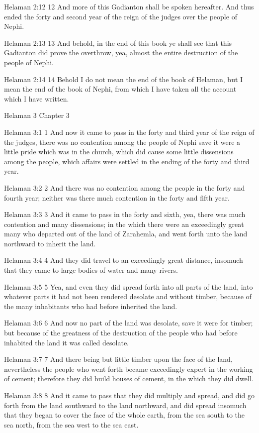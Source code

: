 Helaman 2:12
 12 And more of this Gadianton shall be spoken hereafter. And
thus ended the forty and second year of the reign of the judges
over the people of Nephi.

Helaman 2:13
 13 And behold, in the end of this book ye shall see that this
Gadianton did prove the overthrow, yea, almost the entire
destruction of the people of Nephi.

Helaman 2:14
 14 Behold I do not mean the end of the book of Helaman, but I
mean the end of the book of Nephi, from which I have taken all
the account which I have written.

Helaman 3
Chapter 3

Helaman 3:1
 1 And now it came to pass in the forty and third year of the
reign of the judges, there was no contention among the people of
Nephi save it were a little pride which was in the church, which
did cause some little dissensions among the people, which affairs
were settled in the ending of the forty and third year.

Helaman 3:2
 2 And there was no contention among the people in the forty and
fourth year; neither was there much contention in the forty and
fifth year.

Helaman 3:3
 3 And it came to pass in the forty and sixth, yea, there was
much contention and many dissensions; in the which there were an
exceedingly great many who departed out of the land of Zarahemla,
and went forth unto the land northward to inherit the land.

Helaman 3:4
 4 And they did travel to an exceedingly great distance, insomuch
that they came to large bodies of water and many rivers.

Helaman 3:5
 5 Yea, and even they did spread forth into all parts of the
land, into whatever parts it had not been rendered desolate and
without timber, because of the many inhabitants who had before
inherited the land.

Helaman 3:6
 6 And now no part of the land was desolate, save it were for
timber; but because of the greatness of the destruction of the
people who had before inhabited the land it was called desolate.

Helaman 3:7
 7 And there being but little timber upon the face of the land,
nevertheless the people who went forth became exceedingly expert
in the working of cement; therefore they did build houses of
cement, in the which they did dwell.

Helaman 3:8
 8 And it came to pass that they did multiply and spread, and did
go forth from the land southward to the land northward, and did
spread insomuch that they began to cover the face of the whole
earth, from the sea south to the sea north, from the sea west to
the sea east.

